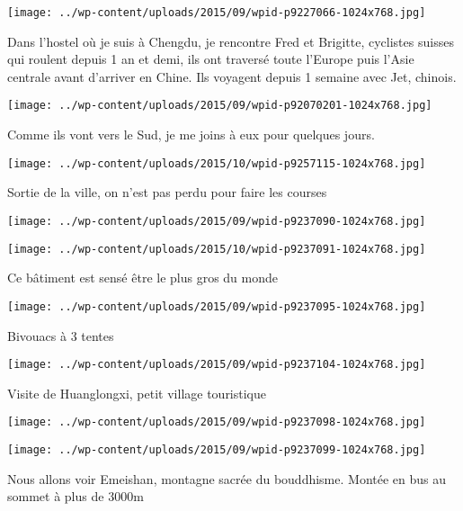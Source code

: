 \centerline{\texttt{[image: ../wp-content/uploads/2015/09/wpid-p9227066-1024x768.jpg]} } 
 \newline
 Dans l'hostel où je suis à Chengdu, je rencontre Fred et Brigitte, cyclistes suisses qui roulent depuis 1 an et demi, ils ont traversé toute l'Europe puis l'Asie centrale avant d'arriver en Chine. Ils voyagent depuis 1 semaine avec Jet, chinois. \newline
 \newline
\centerline{\texttt{[image: ../wp-content/uploads/2015/09/wpid-p92070201-1024x768.jpg]} } 
 \newline
 Comme ils vont vers le Sud, je me joins à eux pour quelques jours. \newline
 \newline
\centerline{\texttt{[image: ../wp-content/uploads/2015/10/wpid-p9257115-1024x768.jpg]} } 
 \newline
 Sortie de la ville, on n'est pas perdu pour faire les courses \newline
 \newline
\centerline{\texttt{[image: ../wp-content/uploads/2015/09/wpid-p9237090-1024x768.jpg]} } 
 \newline
 \newline
\centerline{\texttt{[image: ../wp-content/uploads/2015/10/wpid-p9237091-1024x768.jpg]} } 
 \newline
 Ce bâtiment est sensé être le plus gros du monde \newline
 \newline
\centerline{\texttt{[image: ../wp-content/uploads/2015/09/wpid-p9237095-1024x768.jpg]} } 
 \newline
 Bivouacs à 3 tentes \newline
 \newline
\centerline{\texttt{[image: ../wp-content/uploads/2015/09/wpid-p9237104-1024x768.jpg]} } 
 \newline
 Visite de Huanglongxi, petit village touristique \newline
 \newline
\centerline{\texttt{[image: ../wp-content/uploads/2015/09/wpid-p9237098-1024x768.jpg]} } 
 \newline
 \newline
\centerline{\texttt{[image: ../wp-content/uploads/2015/09/wpid-p9237099-1024x768.jpg]} } 
 \newline
 Nous allons voir Emeishan, montagne sacrée du bouddhisme. Montée en bus au sommet à plus de 3000m \newline
